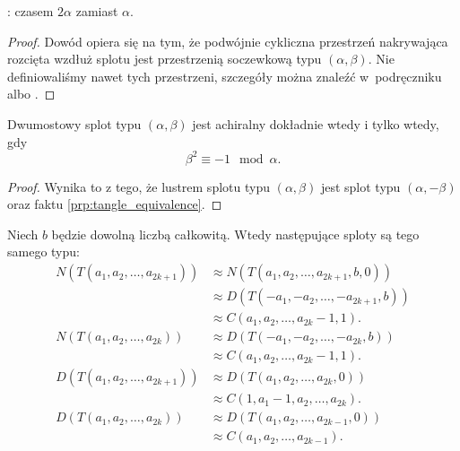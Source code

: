 
\begin{tobedone}
    \cite[s. 23]{kawauchi96}: czasem $2\alpha$ zamiast $\alpha$.
\end{tobedone}

\begin{proof}
    Dowód opiera się na tym, że podwójnie cykliczna przestrzeń nakrywająca rozcięta wzdłuż splotu jest przestrzenią soczewkową typu $(\alpha, \beta)$.
    Nie definiowaliśmy nawet tych przestrzeni, szczegóły można znaleźć w~podręczniku \cite{murasugi96} albo \cite{schubert56}.
\end{proof}

\begin{proposition}
    Dwumostowy splot typu $(\alpha, \beta)$ jest achiralny dokładnie wtedy i tylko wtedy, gdy
    \begin{equation}
        \beta^2 \equiv -1 \mod \alpha.
    \end{equation}
\end{proposition}

\begin{proof}
    Wynika to z tego, że lustrem splotu typu $(\alpha, \beta)$ jest splot typu $(\alpha, -\beta)$ oraz faktu \ref{prp:tangle_equivalence}.
\end{proof}

\begin{proposition}
    Niech $b$ będzie dowolną liczbą całkowitą.
    Wtedy następujące sploty są tego samego typu:
    \begin{align}
        N(T(a_1, a_2, \ldots, a_{2k+1})) & \approx N(T(a_1, a_2, \ldots, a_{2k+1}, b, 0)) \\
                                         & \approx D(T(-a_1, -a_2, \ldots, -a_{2k+1}, b)) \\
                                         & \approx C(a_1, a_2, \ldots, a_{2k}-1, 1). \\
        N(T(a_1, a_2, \ldots, a_{2k}))   & \approx D(T(-a_1, -a_2, \ldots, -a_{2k}, b)) \\
                                         & \approx C(a_1, a_2, \ldots, a_{2k}-1, 1). \\
        D(T(a_1, a_2, \ldots, a_{2k+1})) & \approx D(T(a_1, a_2, \ldots, a_{2k}, 0)) \\
                                         & \approx C(1, a_1-1, a_2, \ldots, a_{2k}). \\
        D(T(a_1, a_2, \ldots, a_{2k}))   & \approx D(T(a_1, a_2, \ldots, a_{2k-1}, 0)) \\
                                         & \approx C(a_1, a_2, \ldots, a_{2k-1}).
    \end{align}
\end{proposition}

